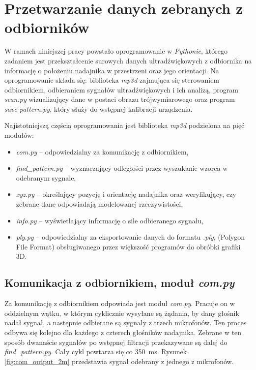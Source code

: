 \chapter{Przetwarzanie danych zebranych z odbiorników}

W ramach niniejszej pracy powstało oprogramowanie w \textit{Pythonie}, którego zadaniem jest
przekształcenie surowych danych ultradźwiękowych 
z odbiornika na informację o położeniu nadajnika w przestrzeni oraz jego orientacji.
Na oprogramowanie składa się: biblioteka \textit{mp3d} zajmująca się
sterowaniem odbiornikiem, odbieraniem sygnałów ultradźwiękowych i ich analizą, program \textit{scan.py}
wizualizujący dane w postaci obrazu trójwymiarowego oraz program \textit{save-pattern.py},
który służy do wstępnej kalibracji urządzenia.

Najistotniejszą częścią oprogramowania jest biblioteka \textit{mp3d} podzielona na pięć modułów:
\begin{itemize}
 \item \textit{com.py} --  odpowiedzialny za komunikację z odbiornikiem,
 \item \textit{find\_pattern.py} --  wyznaczający odległości przez wyszukanie wzorca w odebranym sygnale,
 \item \textit{xyz.py} --  określający pozycję i orientację nadajnika oraz  weryfikujący, 
 czy zebrane dane odpowiadają modelowanej rzeczywistości,
 \item \textit{info.py} --  wyświetlający informację o sile odbieranego sygnału,
 \item \textit{ply.py} --  odpowiedzialny za eksportowanie danych do formatu \textit{.ply},
    (Polygon File Format) obsługiwanego przez większość programów do obróbki grafiki 3D.
\end{itemize}


\section{Komunikacja z odbiornikiem, moduł \textit{com.py}}

Za komunikację z odbiornikiem odpowiada jest moduł \textit{com.py}.
Pracuje on w oddzielnym wątku, w którym cyklicznie wysyłane są żądania, by dany głośnik nadał sygnał,
a następnie odbierane są sygnały z trzech mikrofonów.
Ten proces odbywa się kolejno dla każdego z czterech głośników nadajnika.
Zebrane w ten sposób dwanaście sygnałów po wstępnej filtracji przekazywane są dalej do \textit{find\_pattern.py}. Cały cykl powtarza 
się co \SI{350}{ms}. Rysunek \ref{fig:com_output_2m} przedstawia sygnał odebrany z jednego z mikrofonów.


